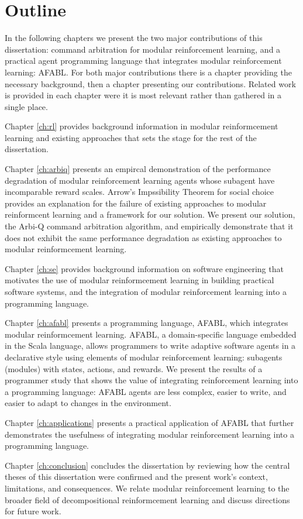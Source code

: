 \section{Outline}

In the following chapters we present the two major contributions of this dissertation: command arbitration for modular reinforcement learning, and a practical agent programming language that integrates modular reinforcement learning: AFABL. For both major contributions there is a chapter providing the necessary background, then a chapter presenting our contributions. Related work is provided in each chapter were it is most relevant rather than gathered in a single place.

Chapter \ref{ch:rl} provides background information in modular reinformcement learning and existing approaches that sets the stage for the rest of the dissertation.

Chapter \ref{ch:arbiq} presents an empircal demonstration of the performance degradation of modular reinforcement learning agents whose subagent have incomparable reward scales. Arrow's Impssibility Theorem for social choice provides an explanation for the failure of existing approaches to modular reinformcent learning and a framework for our solution. We present our solution, the Arbi-Q command arbitration algorithm, and empirically demonstrate that it does not exhibit the same performance degradation as existing approaches to modular reinformcement learning.

Chapter \ref{ch:se} provides background information on software engineering that motivates the use of modular reinformcement learning in building practical software systems, and the integration of modular reinforcement learning into a programming language.

Chapter \ref{ch:afabl} presents a programming language, AFABL, which integrates modular reinformcement learning. AFABL, a domain-specific language embedded in the Scala language, allows programmers to write adaptive software agents in a declarative style using elements of modular reinforcement learning: subagents (modules) with states, actions, and rewards. We present the results of a programmer study that shows the value of integrating reinforcement learning into a programming language: AFABL agents are less complex, easier to write, and easier to adapt to changes in the environment.

Chapter \ref{ch:applications} presents a practical application of AFABL that further demonstrates the usefulness of integrating modular reinforcement learning into a programming language.

Chapter \ref{ch:conclusion} concludes the dissertation by reviewing how the central theses of this dissertation were confirmed and the present work's context, limitations, and consequences. We relate modular reinforcement learning to the broader field of decompositional reinformcement learning and discuss directions for future work.
